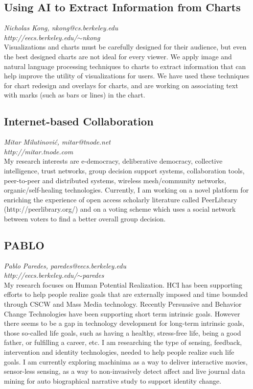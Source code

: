 \documentclass[foldmark,10pt,a4paper,notumble]{leaflet}
\begin{document}
\subsection{Using AI to Extract Information from Charts}
\emph{Nicholas Kong, nkong@cs.berkeley.edu}\\
\emph{http://eecs.berkeley.edu/$\sim$nkong}\\
Visualizations and charts must be carefully designed for their audience, but even the best designed charts are not ideal for every viewer. We apply image and natural language processing techniques to charts to extract information that can help improve the utility of visualizations for users. We have used these techniques for chart redesign and overlays for charts, and are working on associating text with marks (such as bars or lines) in the chart.

\subsection{Internet-based Collaboration}
\emph{Mitar Milutinovi\'c, mitar@tnode.net}\\
\emph{http://mitar.tnode.com}\\
My research interests are e-democracy, deliberative democracy,
collective intelligence, trust networks, group decision support systems,
collaboration tools, peer-to-peer and distributed systems, wireless
mesh/community networks, organic/self-healing technologies. Currently, I
am working on a novel platform for enriching the experience of open
access scholarly literature called PeerLibrary (http://peerlibrary.org/)
and on a voting scheme which uses a social network between voters to
find a better overall group decision.

\subsection{PABLO}
\emph{Pablo Paredes, paredes@eecs.berkeley.edu}\\
\emph{http://eecs.berkeley.edu/$\sim$paredes}\\
My research focuses on Human Potential Realization. HCI has been supporting efforts to help people realize goals that are externally imposed and time bounded through CSCW and Mass Media technology. Recently Persuasive and Behavior Change Technologies have been supporting short term intrinsic goals. However there seems to be a gap in technology development for long-term intrinsic goals, those so-called life goals, such as having a healthy, stress-free life, being a good father, or fulfilling a career, etc. I am researching the type of sensing, feedback, intervention and identity technologies, needed to help people realize such life goals. I am currently exploring machinima as a way to deliver interactive movies, sensor-less sensing, as a way to non-invasively detect affect and live journal data mining for auto biographical narrative study to support identity change.
\end{document}
